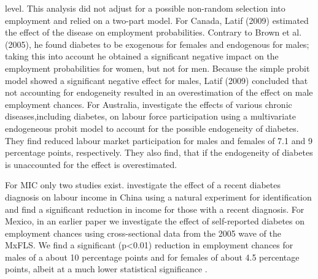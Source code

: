 level. This analysis did not adjust for a possible non-random selection into employment and relied on a two-part model. 
For Canada, Latif (2009) estimated the effect of the disease on employment probabilities. Contrary to Brown et al. (2005), he found diabetes to be exogenous for females and endogenous for males; taking this into account he obtained a significant negative impact on the employment probabilities for women, but not for men. Because the simple probit model showed a significant negative effect for males, Latif (2009) concluded that not accounting for 
endogeneity resulted in an overestimation of the effect on male employment chances. For Australia, \cite{Zhang_2009} investigate the effects of various chronic diseases,including diabetes, on labour force participation using a multivariate endogeneous probit model to account for the possible endogeneity of diabetes. They find reduced labour market participation for males and females of 7.1 and 9 percentage points, respectively. They also find, that if the endogeneity of diabetes is unaccounted for the effect is overestimated. 

For \ac{MIC} only two studies exist. \citet{Liu2014} investigate the effect of a recent diabetes diagnosis on labour income
in China using a natural experiment for identification and find a
significant reduction in income for those with a recent diagnosis.
For Mexico, in an earlier paper we investigate the effect of self-reported
diabetes on employment chances using cross-sectional data from the
2005 wave of the \ac{MxFLS}. We find a significant (p<0.01) reduction
in employment chances for males of a about 10 percentage points and
for females of about 4.5 percentage points, albeit at a much lower
statistical significance \citep{Seuring2015}.

